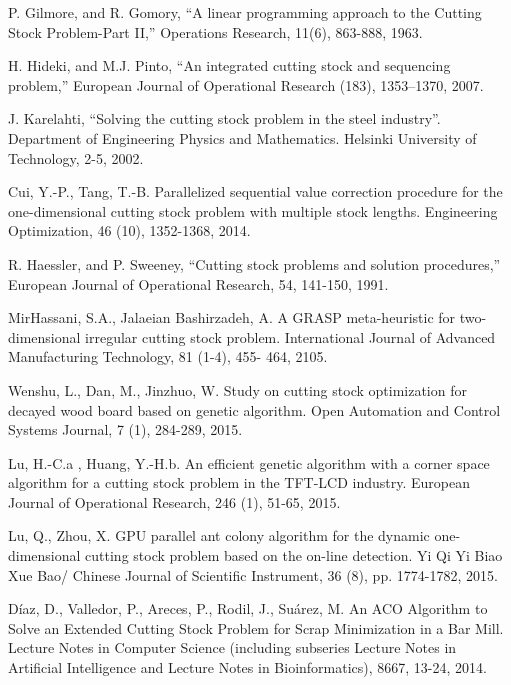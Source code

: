 \documentclass[a4paper,10pt,twocolumn]{article}
\begin{document}
\begin{thebibliography}{99}
	 P. Gilmore, and R. Gomory, “A linear programming
	approach to the Cutting Stock Problem-Part II,”
	Operations Research, 11(6), 863-888, 1963.
	
	 H. Hideki, and M.J. Pinto, “An integrated cutting
	stock and sequencing problem,” European Journal of
	Operational Research (183), 1353–1370, 2007.
	
	J. Karelahti, “Solving the cutting stock problem in
	the steel industry”. Department of Engineering Physics
	and Mathematics. Helsinki University of Technology,
	2-5, 2002.
	
	  Cui, Y.-P., Tang, T.-B. Parallelized sequential value correction procedure for the one-dimensional cutting
	stock problem with multiple stock lengths. Engineering
	Optimization, 46 (10), 1352-1368, 2014.
	
	 R. Haessler, and P. Sweeney, “Cutting stock
	problems and solution procedures,” European Journal
	of Operational Research, 54, 141-150, 1991.
	
	 MirHassani, S.A., Jalaeian Bashirzadeh, A. A
	GRASP meta-heuristic for two-dimensional irregular
	cutting stock problem. International Journal of
	Advanced Manufacturing Technology, 81 (1-4), 455-
	464, 2105.
	
	  Wenshu, L., Dan, M., Jinzhuo, W. Study on cutting
	stock optimization for decayed wood board based
	on genetic algorithm. Open Automation and Control
	Systems Journal, 7 (1), 284-289, 2015.
	
	  Lu, H.-C.a , Huang, Y.-H.b. An efficient genetic
	algorithm with a corner space algorithm for a cutting
	stock problem in the TFT-LCD industry. European
	Journal of Operational Research, 246 (1), 51-65, 2015.
	
	Lu, Q., Zhou, X. GPU parallel ant colony algorithm
	for the dynamic one-dimensional cutting stock problem
	based on the on-line detection. Yi Qi Yi Biao Xue Bao/
	Chinese Journal of Scientific Instrument, 36 (8), pp.
	1774-1782, 2015.
	
	  Díaz, D., Valledor, P., Areces, P., Rodil, J., Suárez, M.
	An ACO Algorithm to Solve an Extended Cutting Stock
	Problem for Scrap Minimization in a Bar Mill. Lecture
	Notes in Computer Science (including subseries Lecture
	Notes in Artificial Intelligence and Lecture Notes in
	Bioinformatics), 8667, 13-24, 2014.
	

\end{thebibliography}
\end{document}
